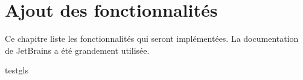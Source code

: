 \chapter{Ajout des fonctionnalités}
\noindent Ce chapitre liste les fonctionnalités qui seront implémentées. 
\newdoubleline La documentation de JetBrains a été grandement utilisée\cite{pluginDoc}.






\gls{testgls}